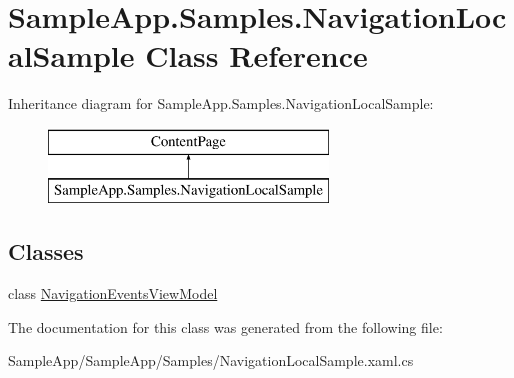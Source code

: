 \hypertarget{class_sample_app_1_1_samples_1_1_navigation_local_sample}{}\section{Sample\+App.\+Samples.\+Navigation\+Local\+Sample Class Reference}
\label{class_sample_app_1_1_samples_1_1_navigation_local_sample}
Inheritance diagram for Sample\+App.\+Samples.\+Navigation\+Local\+Sample\+:\begin{figure}[H]
\begin{center}
\leavevmode
\includegraphics[height=2.000000cm]{class_sample_app_1_1_samples_1_1_navigation_local_sample}
\end{center}
\end{figure}
\subsection*{Classes}
\begin{DoxyCompactItemize}
\item 
class \hyperlink{class_sample_app_1_1_samples_1_1_navigation_local_sample_1_1_navigation_events_view_model}{Navigation\+Events\+View\+Model}
\end{DoxyCompactItemize}


The documentation for this class was generated from the following file\+:\begin{DoxyCompactItemize}
\item 
Sample\+App/\+Sample\+App/\+Samples/Navigation\+Local\+Sample.\+xaml.\+cs\end{DoxyCompactItemize}
